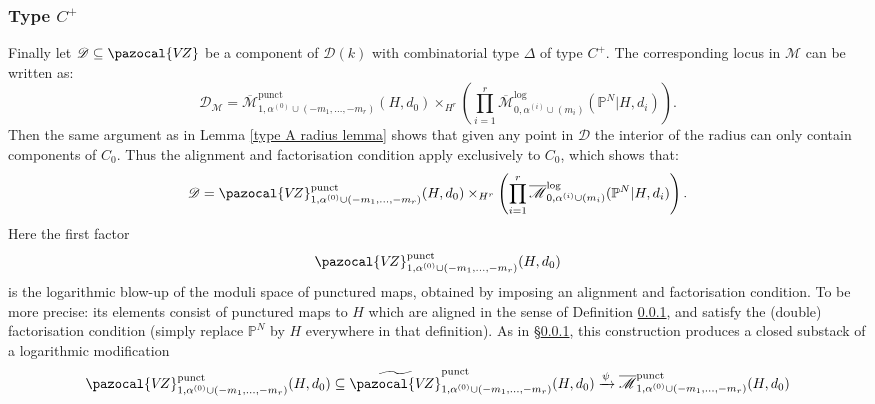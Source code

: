 \documentclass[11pt]{amsart}
\newcommand{\Mlog}[4]{\overline{\mathcal{M}}^{\operatorname{log}}_{#1,#2}(#3,#4)}
\newcommand{\Mpunct}[4]{\overline{\mathcal{M}}^{\operatorname{punct}}_{#1,#2}(#3,#4)}
\newcommand{\PP}{\mathbb P}
\newcommand{\VZ}{\pazocal{V\!Z}}
\newcommand{\Mcal}{\mathcal{M}}
\newcommand{\Dcal}{\mathcal{D}}
\theoremstyle{definition}
\theoremstyle{definition}
\begin{document}
\subsubsection{Type $C^+$} Finally let $\Dcal \subseteq \VZ$ be a component of $\Dcal(k)$ with combinatorial type $\Delta$ of type $C^+$. The corresponding locus in $\Mcal$ can be written as:
\begin{equation*} \Dcal_\Mcal = \Mpunct{1}{\alpha^{(0)}\cup(-m_1,\ldots,-m_r)}{H}{d_0} \times_{H^r} \left( \prod_{i=1}^r \Mlog{0}{\alpha^{(i)}\cup(m_i)}{\PP^N|H}{d_i} \right). \end{equation*}
Then the same argument as in Lemma \ref{type A radius lemma} shows that given any point in $\Dcal$ the interior of the radius can only contain components of $C_0$. Thus the alignment and factorisation condition apply exclusively to $C_0$, which shows that:
\begin{equation*}\Dcal = \VZ^{\operatorname{punct}}_{1,\alpha^{(0)}\cup(-m_1,\ldots,-m_r)}(H,d_0) \times_{H^r} \left( \prod_{i=1}^r \Mlog{0}{\alpha^{(i)}\cup(m_i)}{\PP^N|H}{d_i} \right). \end{equation*}
Here the first factor
\begin{equation*}\VZ^{\operatorname{punct}}_{1,\alpha^{(0)}\cup(-m_1,\ldots,-m_r)}(H,d_0) \end{equation*}
is the logarithmic blow-up of the moduli space of punctured maps, obtained by imposing an alignment and factorisation condition. To be more precise: its elements consist of punctured maps to $H$ which are aligned in the sense of Definition \ref{}, and satisfy the (double) factorisation condition (simply replace $\PP^N$ by $H$ everywhere in that definition). As in \S \ref{}, this construction produces a closed substack of a logarithmic modification
\begin{equation*} \VZ^{\operatorname{punct}}_{1,\alpha^{(0)}\cup(-m_1,\ldots,-m_r)}(H,d_0)\subseteq \widetilde{\VZ}^{\operatorname{punct}}_{1,\alpha^{(0)}\cup(-m_1,\ldots,-m_r)}(H,d_0) \xrightarrow{\psi} \Mpunct{1}{\alpha^{(0)}\cup(-m_1,\ldots,-m_r)}{H}{d_0} \end{equation*}
\end{document}
